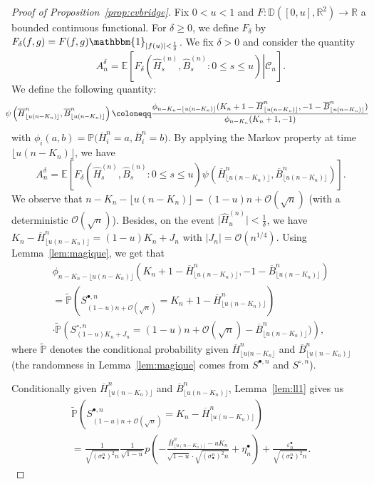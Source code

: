 \documentclass[AHL,XML,longabstracts,Unicode]{cedram}
\newcommand{\R}{\mathbb{R}}
\newcommand{\D}{\mathbb{D}}
\def\sbn{\sigma_{\bullet}^{n}}
\def\Sbn{S^{\bullet,n}}
\def\Scn{S^{\circ,n}}
\def\oB{\overline{B}}
\def\hB{\widehat{B}}
\def\oH{\overline{H}}
\def\hH{\widehat{H}}
\renewcommand{\epsilon}{\varepsilon}
\newcommand\Es[1]{\mathbb{E}\left[#1\right]}
\newcommand\tPr[1]{\tilde{\mathbb{P}}\left(#1\right)}
\newcommand\Prb[1]{\mathbb{P}\big(#1\big)}
\begin{document}
\begin{proof}[Proof of Proposition~\ref{prop:cvbridge}]
Fix $0<u<1$ and $F : \D([0,u],\R^{2}) \rightarrow \R$ a bounded continuous functional. For $\delta \geq 0$, we define $F_{\delta}$ by $F_{\delta}(f,g)=F(f,g) \mathbbm{1}_{|f(u)|< \frac{1}{\delta}}$. We fix $\delta>0$ and consider the quantity
\[A^{\delta}_{n}= \Es{ \left. F_{\delta} \left(    \hH^{(n)}_{s},  \hB^{(n)}_{s}: 0 \leq s \leq u \right)
\right| \mathcal{C}_{n}}.\]
We define the following quantity:
\begin{equation}
  \hspace{-3mm} \psi \left( \oH^{n}_{ \lfloor u (n-K_{n}) \rfloor },\oB^{n}_{ \lfloor u (n-K_{n}) \rfloor } \right) \coloneqq \frac{\phi_{n-K_{n}- \lfloor u (n-K_{n}) \rfloor} (K_{n}+1-\oH^{n}_{ \lfloor u (n-K_{n}) \rfloor } ,-1-\oB^{n}_{\lfloor u (n-K_{n}) \rfloor})}{\phi_{n-K_{n}} (K_{n}+1,-1) }
  \label{eq:def_psi}
\end{equation}
with $\phi_{i}(a,b)=\Prb{\oH^{n}_{i}=a,\oB^{n}_{i}=b}$.
By applying the Markov property at time $\lfloor u (n-K_{n}) \rfloor$, we have
\begin{equation}
  A^{\delta}_{n}= \Es{  F_{\delta} \left(   \hH^{(n)}_{s},  \hB^{(n)}_{s}: 0 \leq s \leq u \right) \psi \left( \oH^{n}_{ \lfloor u (n-K_{n}) \rfloor },\oB^{n}_{ \lfloor u (n-K_{n}) \rfloor } \right)  } .
  \label{eq:Adn}
\end{equation}
We observe that $n-K_{n}- \lfloor u (n-K_{n}) \rfloor= (1-u)n+\mathcal O(\sqrt{n})$ (with a deterministic $\mathcal O(\sqrt{n})$).
Besides, on the event $ \big| \hH^{(n)}_{u} \big| < \tfrac{1}{\delta}$,
we have $K_{n}-\oH^{n}_{ \lfloor u (n-K_{n}) \rfloor}=(1-u)K_{n}+J_{n}$ with $|J_{n}|= \mathcal{O}(n^{1/4})$.
Using Lemma~\ref{lem:magique}, we get that
\begin{multline}
 \phi_{n-K_{n}- \lfloor u (n-K_{n}) \rfloor} (K_{n}+1-\oH^{n}_{ \lfloor u (n-K_{n}) \rfloor } ,-1-\oB^{n}_{\lfloor u (n-K_{n}) \rfloor})\\
   = \tPr{\Sbn_{(1-u)n+\mathcal O(\sqrt{n})}=K_{n}+1-\oH^{n}_{ \lfloor u (n-K_{n}) \rfloor}}  \\
   \cdot\tPr{\Scn_{(1-u) K_{n}+ J_{n}}= (1-u)n+\mathcal O(\sqrt{n})-\oB^{n}_{\lfloor u (n-K_{n}) \rfloor})},
   \label{eq:Tech4}
\end{multline}
where $\tilde{\mathbb{P}}$ denotes the conditional probability given $\oH^{n}_{ \lfloor u (n-K_{n} \rfloor}$ and $\oB^{n}_{\lfloor u (n-K_{n})\rfloor}$
(the randomness in Lemma~\ref{lem:magique} comes from $\Sbn$ and $\Scn$).

Conditionally given $\oH^{n}_{ \lfloor u (n-K_{n}) \rfloor }$ and $\oB^{n}_{ \lfloor u (n-K_{n}) \rfloor }$,
Lemma~\ref{lem:ll1} gives us
\begin{multline*}
\tPr{\Sbn_{(1-u)n+\mathcal O(\sqrt{n})}=K_{n}-\oH^{n}_{ \lfloor u (n-K_{n}) \rfloor}}\\
  = \frac{1}{\sqrt{ (\sbn)^{2}  n} } \frac{1}{\sqrt{1-u}} p \left(  -   \frac{\oH^{n}_{ \lfloor u (n-K_{n}) \rfloor } - u K_{n}}{ \sqrt{1-u} \cdot \sqrt{ (\sbn)^{2} n} }  + \eta^{\bullet}_{n}\right) +  \frac{\epsilon^{\bullet}_{n}}{\sqrt{ (\sbn)^{2}  n}}.
\end{multline*}


\end{proof}
\end{document}
